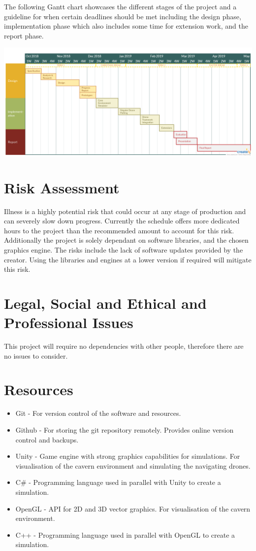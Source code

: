 \documentclass{article}
\begin{document}
The following Gantt chart showcases the different stages of the project and a guideline for when certain deadlines should be met including the design phase, implementation phase which also includes some time for extension work, and the report phase.

\includegraphics[scale=0.22]{timetable.png}

\section{Risk Assessment}
Illness is a highly potential risk that could occur at any stage of production and can severely slow down progress. Currently the schedule offers more dedicated hours to the project than the recommended amount to account for this risk. Additionally the project is solely dependant on software libraries, and the chosen graphics engine. The risks include the lack of software updates provided by the creator. Using the libraries and engines at a lower version if required will mitigate this risk.

\section{Legal, Social and Ethical and Professional Issues}
This project will require no dependencies with other people, therefore there are no issues to consider.


\section{Resources}

\begin{itemize}
    \item Git - For version control of the software and resources.
    \item Github - For storing the git repository remotely. Provides online version control and backups.
    \item Unity - Game engine with strong graphics capabilities for simulations. For visualisation of the cavern environment and simulating the navigating drones.
    \item C\# - Programming language used in parallel with Unity to create a simulation.
    \item OpenGL - API for 2D and 3D vector graphics. For visualisation of the cavern environment.
    \item C++ - Programming language used in parallel with OpenGL to create a simulation.
\end{itemize}

\printbibliography
\end{document}

